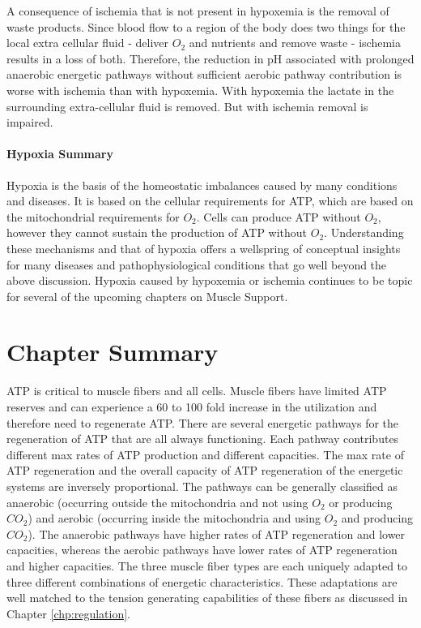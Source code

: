 A consequence of ischemia that is not present in hypoxemia is the removal of waste products. Since blood flow to a region of the body does two things for the local extra cellular fluid - deliver $O_2$ and nutrients and remove waste - ischemia results in a loss of both. Therefore, the reduction in pH associated with prolonged anaerobic energetic pathways without sufficient aerobic pathway contribution is worse with ischemia than with hypoxemia. With hypoxemia the lactate in the surrounding extra-cellular fluid is removed. But with ischemia removal is impaired. 

\paragraph{Hypoxia Summary}
Hypoxia is the basis of the homeostatic imbalances caused by many conditions and diseases. It is based on the cellular requirements for ATP, which are based on the mitochondrial requirements for $O_2$. Cells can produce ATP without $O_2$, however they cannot sustain the production of ATP without $O_2$. Understanding these mechanisms and that of hypoxia offers a wellspring of conceptual insights for many diseases and pathophysiological conditions that go well beyond the above discussion. Hypoxia caused by hypoxemia or ischemia continues to be topic for several of the upcoming chapters on Muscle Support.

\section{Chapter Summary}

ATP is critical to muscle fibers and all cells. Muscle fibers have limited ATP reserves and can experience a 60 to 100 fold increase in the utilization and therefore need to regenerate ATP. There are several energetic pathways for the regeneration of ATP that are all always functioning.  Each pathway contributes different max rates of ATP production and different capacities. The max rate of ATP regeneration and the overall capacity of ATP regeneration of the energetic systems are inversely proportional. The pathways can be generally classified as anaerobic (occurring outside the mitochondria and not using $O_2$ or producing $CO_2$) and aerobic (occurring inside the mitochondria and using $O_2$ and producing $CO_2$). The anaerobic pathways have higher rates of ATP regeneration and lower capacities, whereas the aerobic pathways have lower rates of ATP regeneration and higher capacities. The three muscle fiber types are each uniquely adapted to three different combinations of energetic characteristics. These adaptations are well matched to the tension generating capabilities of these fibers as discussed in Chapter \ref{chp:regulation}. 


